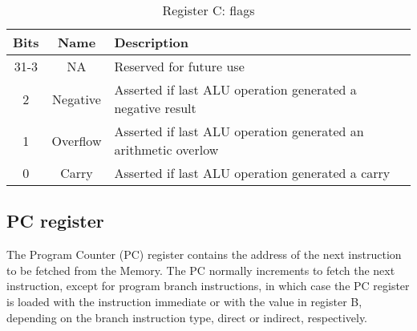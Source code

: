 \begin{table}[!htbp]
  \centering
    \begin{tabular}{|c|c|p{7cm}|}
    \hline 
    {\bf Bits} & {\bf Name} & {\bf Description} \\
    \hline \hline 
    31-3 & NA & Reserved for future use\\
    \hline
    2 & Negative & Asserted if last ALU operation generated a negative result\\
    \hline
    1 & Overflow &  Asserted if last ALU operation generated an arithmetic overlow\\
    \hline
    0 & Carry & Asserted if last ALU operation generated a carry\\
    \hline
    \hline

    \end{tabular}
  \caption{Register C: flags}
  \label{tab:flags}
\end{table}


\subsection{PC register}

The Program Counter (PC) register contains the address of the next instruction
to be fetched from the Memory. The PC normally increments to fetch the next
instruction, except for program branch instructions, in which case the PC
register is loaded with the instruction immediate or with the value in register
B, depending on the branch instruction type, direct or indirect, respectively.
